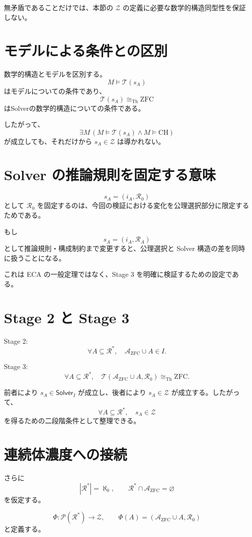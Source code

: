 \documentclass[a4paper,11pt]{article}
\newcommand{\Solver}{\mathsf{Solver}}
\begin{document}
無矛盾であることだけでは、本節の \(\mathcal{Z}\) の定義に必要な数学的構造同型性を保証しない。

\section{モデルによる条件との区別}
数学的構造とモデルを区別する。
\[
M\models\mathcal{T}(s_A)
\]
はモデルについての条件であり、
\[
\mathcal{T}(s_A)\cong_{\mathrm{Th}}\mathrm{ZFC}
\]
はSolverの数学的構造についての条件である。

したがって、
\[
\exists M\,
(M\models\mathcal{T}(s_A)\land M\models\mathrm{CH})
\]
が成立しても、それだけから \(s_A\in\mathcal{Z}\) は導かれない。

\section{Solver の推論規則を固定する意味}
\[
s_A=(i_A,\mathcal{R}_0)
\]
として \(\mathcal{R}_0\) を固定するのは、今回の検証における変化を公理選択部分に限定するためである。

もし
\[
s_A=(i_A,\mathcal{R}_A)
\]
として推論規則・構成制約まで変更すると、公理選択と Solver 構造の差を同時に扱うことになる。

これは ECA の一般定理ではなく、Stage 3 を明確に検証するための設定である。

\section{Stage 2 と Stage 3}
Stage 2:
\[
\forall A\subseteq\mathcal{R}^*,
\quad
\mathcal{A}_{\mathrm{ZFC}}\cup A\in I.
\]

Stage 3:
\[
\forall A\subseteq\mathcal{R}^*,
\quad
\mathcal{T}(\mathcal{A}_{\mathrm{ZFC}}\cup A,\mathcal{R}_0)
\cong_{\mathrm{Th}}\mathrm{ZFC}.
\]

前者により \(s_A\in\Solver_I\) が成立し、後者により \(s_A\in\mathcal{Z}\) が成立する。したがって、
\[
\boxed{\forall A\subseteq\mathcal{R}^*,\quad s_A\in\mathcal{Z}}
\]
を得るための二段階条件として整理できる。

\section{連続体濃度への接続}
さらに
\[
|\mathcal{R}^*|=\aleph_0,
\qquad
\mathcal{R}^*\cap\mathcal{A}_{\mathrm{ZFC}}=\varnothing
\]
を仮定する。

\[
\Phi:\mathcal{P}(\mathcal{R}^*)\to\mathcal{Z},
\qquad
\Phi(A)=
(\mathcal{A}_{\mathrm{ZFC}}\cup A,\mathcal{R}_0)
\]
と定義する。
\end{document}
